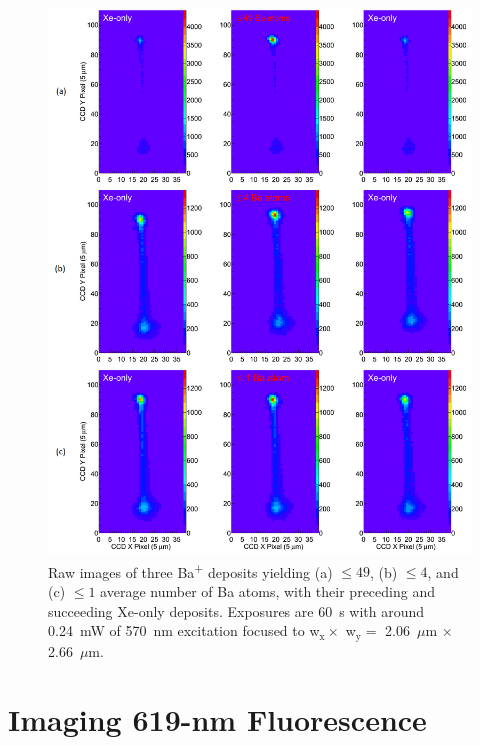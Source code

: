 \begin{figure} %
        \centering
                \includegraphics[width=.95\textwidth]{figures/xebaxe_average_scrunched.png}
                \caption{Raw images of three Ba\textsuperscript{+} deposits yielding (a) $\leq 49$, (b) $\leq 4$, and (c) $\leq 1$ average number of Ba atoms, with their preceding and succeeding Xe-only deposits.  Exposures are 60~s with around 0.24~mW of 570~nm excitation focused to w$_{\text{x}} \times$ w$_{\text{y}} =$ 2.06~$\mu$m $\times$ 2.66~$\mu$m.}
\label{fig:xebaxe}
\end{figure}

\section{Imaging 619-nm Fluorescence}
\label{sec:imaging619}


